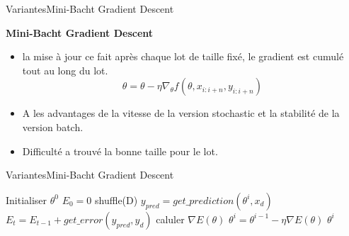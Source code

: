 \documentclass{beamer}
\begin{document}
\begin{frame}{Variantes}{Mini-Bacht Gradient Descent}

	\textbf{Mini-Bacht Gradient Descent}
	\begin{itemize}
		\item la mise à jour ce fait après chaque lot de taille fixé, le gradient est cumulé tout au long du lot.
		\begin{equation}
		\theta = \theta - \eta \nabla_{\theta}f(\theta, x_{i:i+n}, y_{i:i+n})
		\end{equation}
		\item A les advantages de la vitesse de la version stochastic et la stabilité de la version batch.
		\item Difficulté a trouvé la bonne taille pour le lot.
	\end{itemize}

\end{frame}

\begin{frame}{Variantes}{Mini-Bacht Gradient Descent}

\begin{center}
\begin{algorithm}[H]
	\caption{mini\_bacht($ D = \lbrace (x_{1},y_{1})...(x_{n},y_{n}) \rbrace, n\_epoch, \eta, bacht\_size$)}
	\begin{algorithmic} 
		\STATE Initialiser $\theta^{0}$
		\STATE $E_{0} = 0$
		\STATE shuffle(D)
		\STATE $y_{pred} = get\_prediction(\theta^{i}, x_{d})$
		\STATE $E_{t} = E_{t-1} + get\_error(y_{pred}, y_{d})$
		\STATE caluler $\nabla E(\theta )$
		\STATE $\theta^{i} = \theta^{i-1} - \eta\nabla E(\theta ) $
		\ENDFOR
		\ENDFOR
		\ENDFOR
		\RETURN $\theta^{i}$
	\end{algorithmic}
\end{algorithm}
\end{center}

\end{frame}
\end{document}

